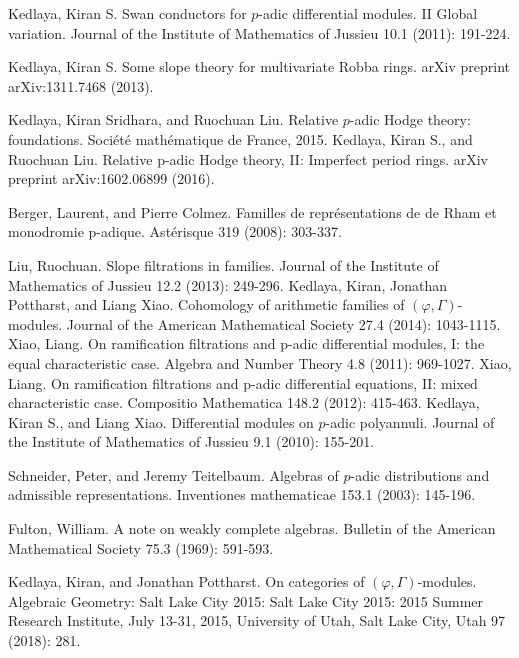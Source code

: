 \documentclass[12pt]{amsart}
\theoremstyle{definition}
\numberwithin{equation}{section}
\begin{document}
\begin{thebibliography}{10}
 Kedlaya, Kiran S. Swan conductors for $p$-adic differential modules. II Global variation. Journal of the Institute of Mathematics of Jussieu 10.1 (2011): 191-224.

 Kedlaya, Kiran S. Some slope theory for multivariate Robba rings. arXiv preprint arXiv:1311.7468 (2013).




 Kedlaya, Kiran Sridhara, and Ruochuan Liu. Relative $p$-adic Hodge theory: foundations. Soci\'et\'e math\'ematique de France, 2015.
 Kedlaya, Kiran S., and Ruochuan Liu. Relative p-adic Hodge theory, II: Imperfect period rings. arXiv preprint arXiv:1602.06899 (2016).

 Berger, Laurent, and Pierre Colmez. Familles de repr\'esentations de de Rham et monodromie p-adique. Ast\'erisque 319 (2008): 303-337.

 Liu, Ruochuan. Slope filtrations in families. Journal of the Institute of Mathematics of Jussieu 12.2 (2013): 249-296.
 Kedlaya, Kiran, Jonathan Pottharst, and Liang Xiao. Cohomology of arithmetic families of $(\varphi,\Gamma)$-modules. Journal of the American Mathematical Society 27.4 (2014): 1043-1115.
 Xiao, Liang. On ramification filtrations and p-adic differential modules, I: the equal characteristic case. Algebra and Number Theory 4.8 (2011): 969-1027.
 Xiao, Liang. On ramification filtrations and p-adic differential equations, II: mixed characteristic case. Compositio Mathematica 148.2 (2012): 415-463.
 Kedlaya, Kiran S., and Liang Xiao. Differential modules on $p$-adic polyannuli. Journal of the Institute of Mathematics of Jussieu 9.1 (2010): 155-201.

 Schneider, Peter, and Jeremy Teitelbaum. Algebras of $p$-adic distributions and admissible representations. Inventiones mathematicae 153.1 (2003): 145-196.


 Fulton, William. A note on weakly complete algebras. Bulletin of the American Mathematical Society 75.3 (1969): 591-593.

 Kedlaya, Kiran, and Jonathan Pottharst. On categories of $(\varphi,\Gamma)$-modules. Algebraic Geometry: Salt Lake City 2015: Salt Lake City 2015: 2015 Summer Research Institute, July 13-31, 2015, University of Utah, Salt Lake City, Utah 97 (2018): 281.



\end{thebibliography}
\end{document}
